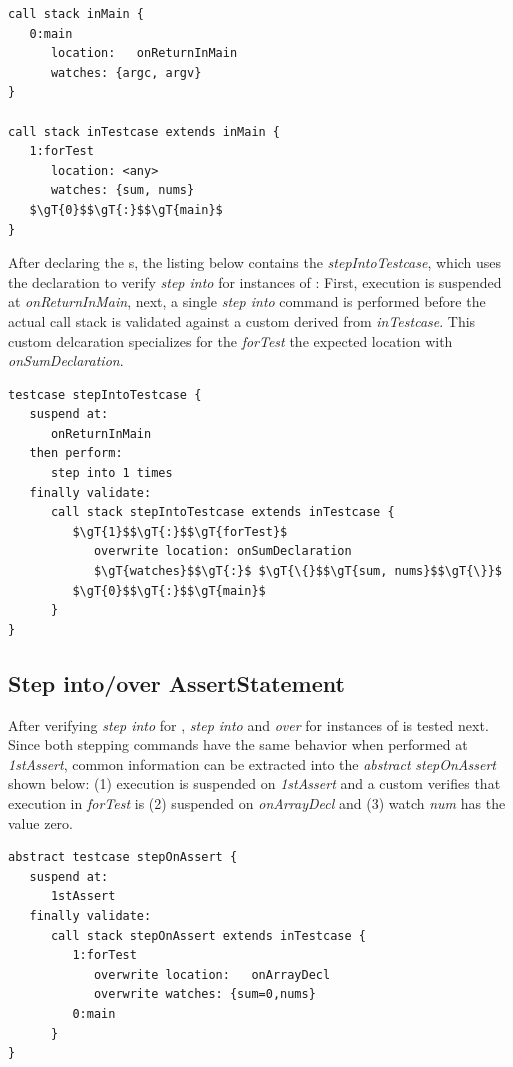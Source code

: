 \begin{lstlisting}[language=testingDSL]
call stack inMain {
   0:main
      location:   onReturnInMain
      watches: {argc, argv}                     
}
   
call stack inTestcase extends inMain {
   1:forTest
      location: <any>
      watches: {sum, nums}                  
   $\gT{0}$$\gT{:}$$\gT{main}$
}
\end{lstlisting}

After declaring the s, the listing below contains
the  \emph{stepIntoTestcase}, which uses the declaration to
verify \emph{step into} for instances of : First,
execution is suspended at \emph{onReturnInMain}, next, a single \emph{step into}
command is performed before the actual call stack is validated against
a custom  derived from \emph{inTestcase}.
This custom delcaration specializes for the 
\emph{forTest} the expected location with \emph{onSumDeclaration}.

\begin{lstlisting}[language=testingDSL]
testcase stepIntoTestcase {            
   suspend at: 
      onReturnInMain
   then perform:                         
      step into 1 times    
   finally validate:                         
      call stack stepIntoTestcase extends inTestcase {
         $\gT{1}$$\gT{:}$$\gT{forTest}$
            overwrite location: onSumDeclaration
            $\gT{watches}$$\gT{:}$ $\gT{\{}$$\gT{sum, nums}$$\gT{\}}$
         $\gT{0}$$\gT{:}$$\gT{main}$                       
      }
}
\end{lstlisting}

\subsection{Step into/over AssertStatement}

After verifying \emph{step into} for , 
\emph{step into} and \emph{over} for instances of  is tested
next. Since both stepping commands have the same behavior when performed at
\emph{1stAssert}, common information can be extracted into the \emph{abstract}
 \emph{stepOnAssert} shown below: (1) execution is
suspended on \emph{1stAssert} and a custom  verifies that
execution in \emph{forTest} is (2) suspended on \emph{onArrayDecl} and
(3) watch \emph{num} has the value zero.
 
\begin{lstlisting}[language=testingDSL]
abstract testcase stepOnAssert {
   suspend at: 
      1stAssert
   finally validate:
      call stack stepOnAssert extends inTestcase {
         1:forTest
            overwrite location:   onArrayDecl
            overwrite watches: {sum=0,nums}
         0:main                      
      }
}
\end{lstlisting}

